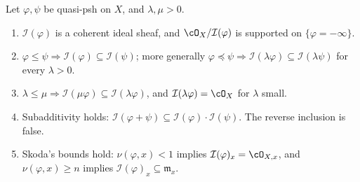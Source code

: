 \begin{proposition}\label{prop:ch51-ideal-formal}
Let \(\varphi,\psi\) be quasi-psh on \(X\), and \(\lambda,\mu>0\).
\begin{enumerate}
\item\label{itm:ch51-if:coherent}
      \(\mathcal I(\varphi)\) is a coherent ideal sheaf, and
      \(\cO_X/\mathcal I(\varphi)\) is supported on
      \(\{\varphi=-\infty\}\).
\item\label{itm:ch51-if:monotone}
      \(\varphi\leq\psi\Rightarrow
      \mathcal I(\varphi)\subseteq\mathcal I(\psi)\); more generally
      \(\varphi\preceq\psi\Rightarrow
      \mathcal I(\lambda\varphi)\subseteq\mathcal I(\lambda\psi)\) for
      every \(\lambda>0\).
\item\label{itm:ch51-if:scale}
      \(\lambda\leq\mu\Rightarrow
      \mathcal I(\mu\varphi)\subseteq\mathcal I(\lambda\varphi)\), and
      \(\mathcal I(\lambda\varphi)=\cO_X\) for \(\lambda\) small.
\item\label{itm:ch51-if:product}
      Subadditivity holds:
      \(\mathcal I(\varphi+\psi)\subseteq
      \mathcal I(\varphi)\cdot\mathcal I(\psi)\).  The reverse inclusion
      is false.
\item\label{itm:ch51-if:skoda-bounds}
      Skoda's bounds hold:
      \(\nu(\varphi,x)<1\) implies
      \(\mathcal I(\varphi)_x=\cO_{X,x}\), and
      \(\nu(\varphi,x)\geq n\) implies
      \(\mathcal I(\varphi)_x\subseteq\mathfrak m_x\).
\end{enumerate}
\end{proposition}

